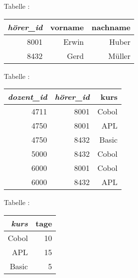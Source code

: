 \begin{minipage}{0.4\textwidth}
Tabelle :

\vspace{2mm}

\begin{tabular}{|r|r|r|}\hline
\textbf{\em hörer\_id} & \textbf{vorname} & \textbf{nachname}\\ \hline
8001 & Erwin & Huber  \\ \hline
8432 & Gerd & Müller \\ \hline
\end{tabular}
\end{minipage}
\begin{minipage}{0.40\textwidth}
Tabelle :

\vspace{2mm}

\begin{tabular}{|r|r|r|}\hline
\textbf{\em dozent\_id} & \textbf{\em hörer\_id} & \textbf{kurs} \\ \hline 
4711 & 8001 & Cobol \\ \hline
4750 & 8001 & APL   \\ \hline
4750 & 8432 & Basic \\ \hline
5000 & 8432 & Cobol \\ \hline
6000 & 8001 & Cobol \\ \hline
6000 & 8432 & APL   \\ \hline
\end{tabular}
\end{minipage}
\begin{minipage}{0.30\textwidth}
Tabelle :

\vspace{2mm}

\begin{tabular}{|r|r|}\hline
\textbf{\em kurs} & \textbf{tage}\\ \hline
Cobol & 10 \\ \hline
APL   & 15 \\ \hline
Basic &  5 \\ \hline
\end{tabular}
\end{minipage}